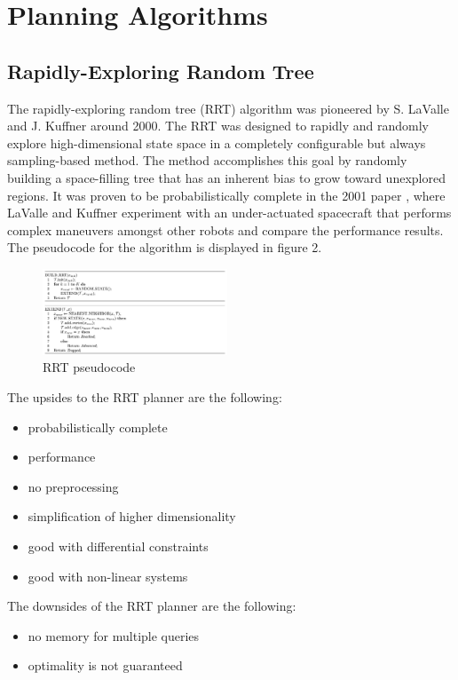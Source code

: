 \documentclass[conference]{IEEEtran} \usepackage[T1]{fontenc} \usepackage[backend=biber, style=ieee]{biblatex}
\begin{document}
\section{Planning Algorithms} \label{Planning Algorithms}

\subsection{Rapidly-Exploring Random Tree} \label{RRT}
The rapidly-exploring random tree (RRT) algorithm was pioneered by S. LaValle and J. Kuffner around 2000. The RRT was designed to rapidly and randomly explore high-dimensional
state space in a completely configurable but always sampling-based method. The method accomplishes this goal by
randomly building a space-filling tree that has an inherent bias to grow toward unexplored regions.
It was proven to be probabilistically complete in the 2001 paper \cite{random_kinodynamics}, where LaValle  and Kuffner 
experiment with an under-actuated spacecraft that performs complex maneuvers amongst other robots and 
compare the performance results. The pseudocode for the algorithm is displayed in figure 2.

\begin{figure}
\label{figure2} 
\centering 
\includegraphics[width=0.49\textwidth]{rrt}
\caption{RRT pseudocode}
\end{figure}

The upsides to the RRT planner are the following:
\begin{itemize}
\item probabilistically complete
\item performance
\item no preprocessing
\item simplification of higher dimensionality
\item good with differential constraints
\item good with non-linear systems
\end{itemize}

The downsides of the RRT planner are the following:
\begin{itemize}
\item no memory for multiple queries
\item optimality is not guaranteed
\end{itemize}
\end{document}
